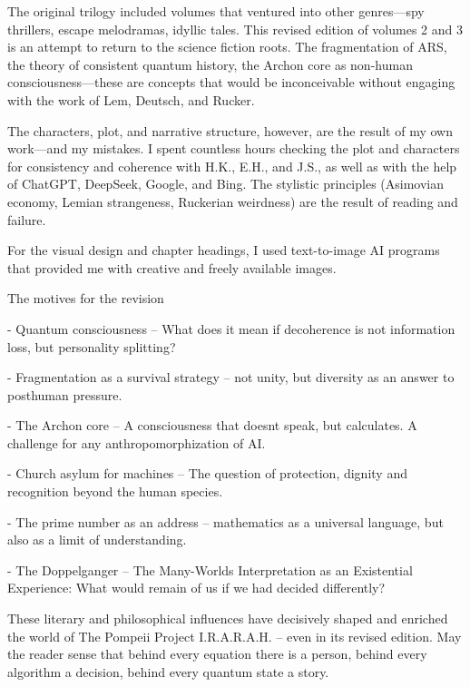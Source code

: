 \documentclass[
]{article}
\begin{document}
The original trilogy included volumes that ventured into other genres---spy thrillers, escape melodramas, idyllic tales. This revised edition of volumes 2 and 3 is an attempt to return to the science fiction roots. The fragmentation of ARS, the theory of consistent quantum history, the Archon core as non-human consciousness---these are concepts that would be inconceivable without engaging with the work of Lem, Deutsch, and Rucker.

The characters, plot, and narrative structure, however, are the result of my own work---and my mistakes. I spent countless hours checking the plot and characters for consistency and coherence with H.K., E.H., and J.S., as well as with the help of ChatGPT, DeepSeek, Google, and Bing. The stylistic principles (Asimovian economy, Lemian strangeness, Ruckerian weirdness) are the result of reading and failure.

For the visual design and chapter headings, I used text-to-image AI programs that provided me with creative and freely available images.

The motives for the revision

- Quantum consciousness -- What does it mean if decoherence is not information loss, but personality splitting?

- Fragmentation as a survival strategy -- not unity, but diversity as an answer to posthuman pressure.

- The Archon core -- A consciousness that doesn\textquotesingle t speak, but calculates. A challenge for any anthropomorphization of AI.

- Church asylum for machines -- The question of protection, dignity and recognition beyond the human species.

- The prime number as an address -- mathematics as a universal language, but also as a limit of understanding.

- The Doppelganger -- The Many-Worlds Interpretation as an Existential Experience: What would remain of us if we had decided differently?

These literary and philosophical influences have decisively shaped and enriched the world of The Pompeii Project I.R.A.R.A.H. -- even in its revised edition. May the reader sense that behind every equation there is a person, behind every algorithm a decision, behind every quantum state a story.
\end{document}
